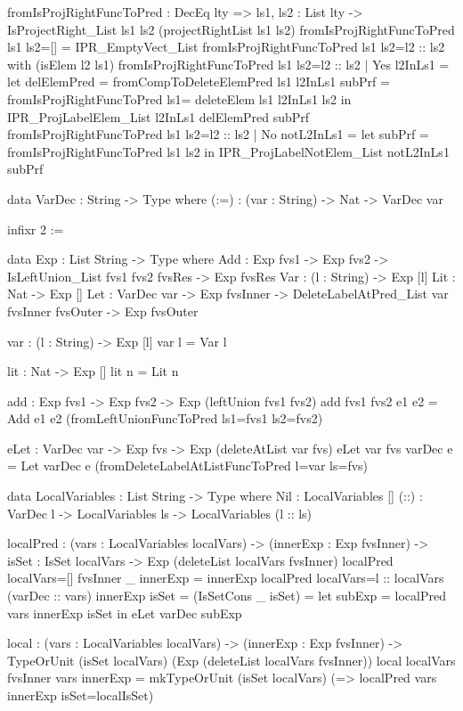 \begin{code}
fromIsProjRightFuncToPred : DecEq lty => {ls1, ls2 : List lty} -> 
  IsProjectRight_List ls1 ls2 (projectRightList ls1 ls2)
fromIsProjRightFuncToPred {ls1} {ls2=[]} = IPR_EmptyVect_List
fromIsProjRightFuncToPred {ls1} {ls2=l2 :: ls2} with (isElem l2 ls1)
  fromIsProjRightFuncToPred {ls1} {ls2=l2 :: ls2} | Yes l2InLs1 =
    let delElemPred = fromCompToDeleteElemPred ls1 l2InLs1
        subPrf = 
          fromIsProjRightFuncToPred {ls1= deleteElem ls1 l2InLs1}  
             {ls2}
    in IPR_ProjLabelElem_List l2InLs1 delElemPred subPrf
  fromIsProjRightFuncToPred {ls1} {ls2=l2 :: ls2} | No notL2InLs1 = 
    let subPrf = fromIsProjRightFuncToPred {ls1} {ls2}
    in IPR_ProjLabelNotElem_List notL2InLs1 subPrf
      
data VarDec : String -> Type where
  (:=) : (var : String) -> Nat -> VarDec var

infixr 2 :=

data Exp : List String -> Type where
  Add : Exp fvs1 -> Exp fvs2 -> 
    IsLeftUnion_List fvs1 fvs2 fvsRes -> Exp fvsRes 
  Var : (l : String) -> Exp [l]
  Lit : Nat -> Exp []
  Let : VarDec var -> Exp fvsInner -> 
    DeleteLabelAtPred_List var fvsInner fvsOuter -> Exp fvsOuter
  
var : (l : String) -> Exp [l]
var l = Var l

lit : Nat -> Exp []
lit n = Lit n

add : Exp fvs1 -> Exp fvs2 -> Exp (leftUnion fvs1 fvs2)
add {fvs1} {fvs2} e1 e2 = 
  Add e1 e2 (fromLeftUnionFuncToPred {ls1=fvs1} {ls2=fvs2})

eLet : VarDec var -> Exp fvs -> Exp (deleteAtList var fvs)
eLet {var} {fvs} varDec e = 
  Let varDec e (fromDeleteLabelAtListFuncToPred {l=var} {ls=fvs})

data LocalVariables : List String -> Type where
  Nil : LocalVariables []
  (::) : VarDec l -> LocalVariables ls -> LocalVariables (l :: ls)  

localPred : (vars : LocalVariables localVars) -> 
  (innerExp : Exp fvsInner) -> {isSet : IsSet localVars} -> 
  Exp (deleteList localVars fvsInner)
localPred {localVars=[]} {fvsInner} _ innerExp = innerExp
localPred {localVars=l :: localVars} (varDec :: vars) innerExp 
  {isSet = (IsSetCons _ isSet)} = 
  let subExp = localPred vars innerExp {isSet}
  in eLet varDec subExp

local : (vars : LocalVariables localVars) -> 
  (innerExp : Exp fvsInner) ->
  TypeOrUnit (isSet localVars) (Exp (deleteList localVars fvsInner))
local {localVars} {fvsInner} vars innerExp = 
  mkTypeOrUnit (isSet localVars)
    (\localIsSet => localPred vars innerExp {isSet=localIsSet})


\end{code}
